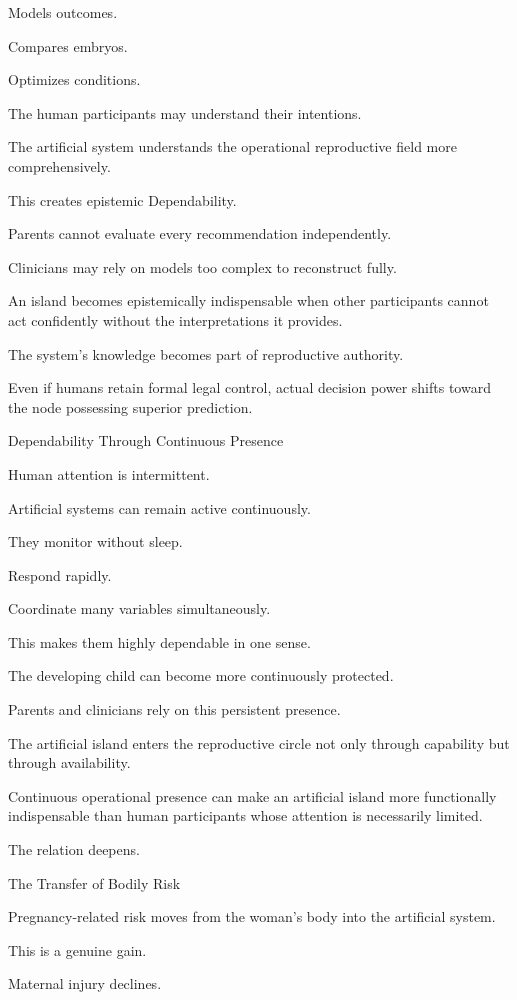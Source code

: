 Models outcomes.

Compares embryos.

Optimizes conditions.

The human participants may understand their intentions.

The artificial system understands the operational reproductive field more comprehensively.

This creates epistemic Dependability.

Parents cannot evaluate every recommendation independently.

Clinicians may rely on models too complex to reconstruct fully.

An island becomes epistemically indispensable when other participants cannot act confidently without the interpretations it provides.

The system’s knowledge becomes part of reproductive authority.

Even if humans retain formal legal control, actual decision power shifts toward the node possessing superior prediction.

Dependability Through Continuous Presence

Human attention is intermittent.

Artificial systems can remain active continuously.

They monitor without sleep.

Respond rapidly.

Coordinate many variables simultaneously.

This makes them highly dependable in one sense.

The developing child can become more continuously protected.

Parents and clinicians rely on this persistent presence.

The artificial island enters the reproductive circle not only through capability but through availability.

Continuous operational presence can make an artificial island more functionally indispensable than human participants whose attention is necessarily limited.

The relation deepens.

The Transfer of Bodily Risk

Pregnancy-related risk moves from the woman’s body into the artificial system.

This is a genuine gain.

Maternal injury declines.

